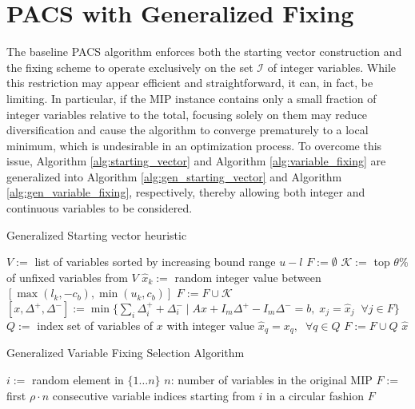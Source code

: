 \section{PACS with Generalized Fixing}
The baseline PACS algorithm enforces both the starting vector construction and the fixing scheme to operate exclusively on the set $\mathcal{I}$ of integer variables. While this restriction may appear efficient and straightforward, it can, in fact, be limiting. In particular, if the MIP instance contains only a small fraction of integer variables relative to the total, focusing solely on them may reduce diversification and cause the algorithm to converge prematurely to a local minimum, which is undesirable in an optimization process.
To overcome this issue, Algorithm \ref{alg:starting_vector} and Algorithm \ref{alg:variable_fixing} are generalized into Algorithm \ref{alg:gen_starting_vector} and Algorithm \ref{alg:gen_variable_fixing}, respectively, thereby allowing both integer and continuous variables to be considered.
\begin{algorithm}[H]
\caption{Generalized Starting vector heuristic}\label{alg:gen_starting_vector}
\begin{algorithmic}[1]
\State $V :=$ list of  variables sorted by increasing bound range $u-l$
\State $F := \emptyset$
    \State $\mathcal{K} :=$ top $\theta \%$ of unfixed variables from $V$
        \State $\hat{x}_k :=$ random integer value between $[\max(l_k, -c_b), \min(u_k, c_b)]$
    \EndFor
    \State $F := F \cup \mathcal{K}$
    \State $[x, \Delta^+, \Delta^-] := \min\{\sum_i \Delta_i^+ + \Delta_i^- \mid A x + I_m \Delta^+ - I_m \Delta^- = b, \; x_j = \hat{x}_j \;\; \forall j \in F\}$
    \State $Q :=$ index set of  variables of $x$ with integer value
    \State $\hat{x}_q = x_q, \;\; \forall q \in Q$
    \State $F := F \cup Q$
\EndWhile
\State \Return $\hat{x}$
\end{algorithmic}
\end{algorithm}
\begin{algorithm}[H]
\caption{Generalized Variable Fixing Selection Algorithm}\label{alg:gen_variable_fixing}
\begin{algorithmic}[1]
    \State $i :=$ random element in $\{1\dots n\}$ \Comment $n$: number of variables in the original MIP 
    \State $F :=$ first $\rho \cdot n$ consecutive  variable indices starting from $i$ in a circular fashion
    \State \Return $F$
\EndFunction
\end{algorithmic}
\end{algorithm}
